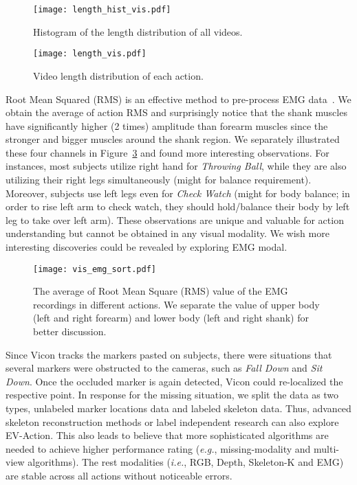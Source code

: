 \documentclass[a4paper, 10pt, conference]{ieeeconf}      \usepackage{FG2020}
\newcommand*\eg{\textit{e.g.}}
\newcommand*\ie{\textit{i.e.}}
\begin{document}
\begin{figure}[!tp]
\centering
\texttt{[image: length\_hist\_vis.pdf]}
\vspace{-2mm}
\caption{Histogram of the length distribution of all videos.}\label{fig:lengthHist}
\vspace{-4mm}
\end{figure}

\begin{figure}[!tp]
\centering
\texttt{[image: length\_vis.pdf]}
\vspace{-1mm}
\caption{Video length distribution of each action.}\label{fig:lengthBox}
\vspace{-4mm}
\end{figure}

Root Mean Squared (RMS) is an effective method to pre-process EMG data~\cite{EMG_intro}. We obtain the average of action RMS and surprisingly notice that the shank muscles have significantly higher (2 times) amplitude than forearm muscles since the stronger and bigger muscles around the shank region. We separately illustrated these four channels in Figure~\ref{fig:emg_sort} and found more interesting observations. For instances, most subjects utilize right hand for \textit{Throwing Ball}, while they are also utilizing their right legs simultaneously (might for balance requirement). Moreover, subjects use left legs even for \textit{Check Watch} (might for body balance; in order to rise left arm to check watch, they should hold/balance their body by left leg to take over left arm). These observations are unique and valuable for action understanding but cannot be obtained in any visual modality. We wish more interesting discoveries could be revealed by exploring EMG modal.

\begin{figure}[!tp]
\centering
\texttt{[image: vis\_emg\_sort.pdf]}
\vspace{-2mm}
\caption{The average of Root Mean Square (RMS) value of the EMG recordings in different actions. We separate the value of upper body (left and right forearm) and lower body (left and right shank) for better discussion.}\label{fig:emg_sort}
\vspace{-3mm}
\end{figure}


Since Vicon tracks the markers pasted on subjects, there were situations that several markers were obstructed to the cameras, such as \textit{Fall Down} and \textit{Sit Down}. Once the occluded marker is again detected, Vicon could re-localized the respective point. In response for the missing situation, we split the data as two types, unlabeled marker locations data and labeled skeleton data. Thus, advanced skeleton reconstruction methods or label independent research can also explore EV-Action. This also leads to believe that more sophisticated algorithms are needed to achieve higher performance rating (\eg, missing-modality and multi-view algorithms). The rest modalities (\ie, RGB, Depth, Skeleton-K and EMG) are stable across all actions without noticeable errors.
\end{document}
